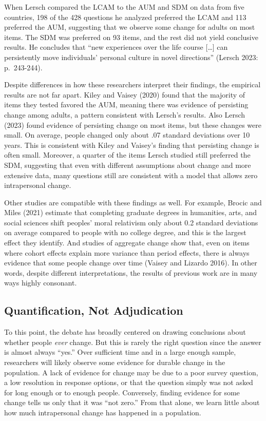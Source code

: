 \documentclass[
  11pt,
]{article}
\begin{document}
When Lersch compared the LCAM to the AUM and SDM on data from five
countries, 198 of the 428 questions he analyzed preferred the LCAM and
113 preferred the AUM, suggesting that we observe some change for adults
on most items. The SDM was preferred on 93 items, and the rest did not
yield conclusive results. He concludes that ``new experiences over the
life course {[}\ldots{]} can persistently move individuals' personal
culture in novel directions'' (Lersch 2023: p.~243-244).

Despite differences in how these researchers interpret their findings,
the empirical results are not far apart. Kiley and Vaisey (2020) found
that the majority of items they tested favored the AUM, meaning there
was evidence of persisting change among adults, a pattern consistent
with Lersch's results. Also Lersch (2023) found evidence of persisting
change on most items, but these changes were small. On average, people
changed only about .07 standard deviations over 10 years. This is
consistent with Kiley and Vaisey's finding that persisting change is
often small. Moreover, a quarter of the items Lersch studied still
preferred the SDM, suggesting that even with different assumptions about
change and more extensive data, many questions still are consistent with
a model that allows zero intrapersonal change.

Other studies are compatible with these findings as well. For example,
Brocic and Miles (2021) estimate that completing graduate degrees in
humanities, arts, and social sciences shift peoples' moral relativism
only about 0.2 standard deviations on average compared to people with no
college degree, and this is the largest effect they identify. And
studies of aggregate change show that, even on items where cohort
effects explain more variance than period effects, there is always
evidence that some people change over time (Vaisey and Lizardo 2016). In
other words, despite different interpretations, the results of previous
work are in many ways highly consonant.

\subsection{Quantification, Not
Adjudication}\label{quantification-not-adjudication}

To this point, the debate has broadly centered on drawing conclusions
about whether people \emph{ever} change. But this is rarely the right
question since the answer is almost always ``yes.'' Over sufficient time
and in a large enough sample, researchers will likely observe some
evidence for durable change in the population. A lack of evidence for
change may be due to a poor survey question, a low resolution in
response options, or that the question simply was not asked for long
enough or to enough people. Conversely, finding evidence for some change
tells us only that it was ``not zero.'' From that alone, we learn little
about how much intrapersonal change has happened in a population.
\end{document}
